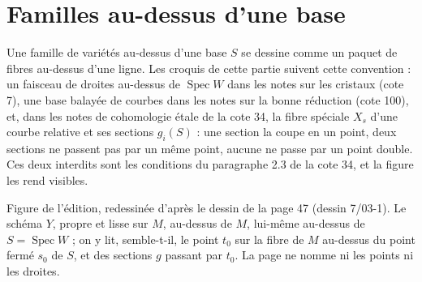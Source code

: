 \documentclass[11pt,a4paper]{article}
\newcommand{\legende}[1]{{\centering\small\color{gray!60!black}#1\par}\medskip}
\newcommand{\cote}[2]{\par\smallskip\noindent{\small\textbf{Cote #1, page #2.}}\par\nopagebreak}
\begin{document}
\section{Familles au-dessus d'une base}

Une famille de variétés au-dessus d'une base $S$ se dessine comme un paquet de fibres au-dessus d'une ligne. Les croquis de cette partie suivent cette convention : un faisceau de droites au-dessus de $\operatorname{Spec} W$ dans les notes sur les cristaux (cote 7), une base balayée de courbes dans les notes sur la bonne réduction (cote 100), et, dans les notes de cohomologie étale de la cote 34, la fibre spéciale $X_s$ d'une courbe relative et ses sections $g_i(S)$ : une section la coupe en un point, deux sections ne passent pas par un même point, aucune ne passe par un point double. Ces deux interdits sont les conditions du paragraphe 2.3 de la cote 34, et la figure les rend visibles.

\cote{7}{47}
\begin{center}
\end{center}
\legende{Figure de l'édition, redessinée d'après le dessin de la page 47 (dessin 7/03-1). Le schéma $Y$, propre et lisse sur $M$, au-dessus de $M$, lui-même au-dessus de $S = \operatorname{Spec} W$ ; on y lit, semble-t-il, le point $t_0$ sur la fibre de $M$ au-dessus du point fermé $s_0$ de $S$, et des sections $g$ passant par $t_0$. La page ne nomme ni les points ni les droites.}
\end{document}
